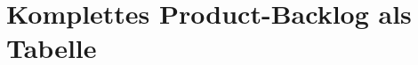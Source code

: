 \documentclass{article}
\begin{document}
\section{Komplettes Product-Backlog als Tabelle}
\end{document}
